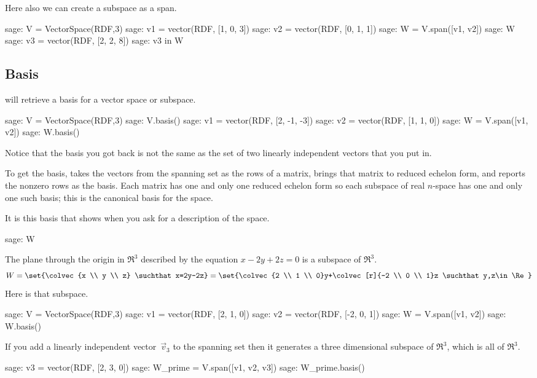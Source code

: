 Here also we can create a subspace as a span.
\begin{sagecommandline}
sage: V = VectorSpace(RDF,3)
sage: v1 = vector(RDF, [1, 0, 3])
sage: v2 = vector(RDF, [0, 1, 1])
sage: W = V.span([v1, v2])
sage: W
sage: v3 = vector(RDF, [2, 2, 8])
sage: v3 in W
\end{sagecommandline}



\subsection{Basis}
\Sage{} will retrieve a basis for a vector space or subspace.
\begin{sagecommandline}
sage: V = VectorSpace(RDF,3)
sage: V.basis()
sage: v1 = vector(RDF, [2, -1, -3])
sage: v2 = vector(RDF, [1, 1, 0])
sage: W = V.span([v1, v2])     
sage: W.basis()
\end{sagecommandline}
Notice that the basis you got back is not the same as the set of two linearly
independent vectors that you put in.

To get the basis, \Sage{} takes the vectors from the spanning set 
as the rows of a matrix,
brings that matrix to reduced echelon form, and reports the nonzero 
rows as the basis.
Each matrix has one and only one reduced echelon form so each 
subspace of real $n$-space has one and only one such basis;
this is the canonical basis for the space.

It is this basis that \Sage{} shows when you ask for a description
of the space.
\begin{sagecommandline}
sage: W  
\end{sagecommandline}

The plane through the origin in $\Re^3$ described by the equation
$x-2y+2z=0$
is a subspace of $\Re^3$.
\begin{equation*}
  W=\set{\colvec{x \\ y \\ z}
    \suchthat x=2y-2z}
  =\set{\colvec{2 \\ 1 \\ 0}y+\colvec[r]{-2 \\ 0 \\ 1}z
        \suchthat y,z\in\Re}
\end{equation*}
Here is that subspace.
\begin{sagecommandline}
sage: V = VectorSpace(RDF,3)               
sage: v1 = vector(RDF, [2, 1, 0]) 
sage: v2 = vector(RDF, [-2, 0, 1]) 
sage: W = V.span([v1, v2])       
sage: W.basis()
\end{sagecommandline}
If you add a linearly independent vector~$\vec{v}_3$ to the spanning set 
then it generates a three dimensional subspace of $\Re^3$, 
which is all of $\Re^3$.
\begin{sagecommandline}
sage: v3 = vector(RDF, [2, 3, 0])
sage: W_prime = V.span([v1, v2, v3])
sage: W_prime.basis()
\end{sagecommandline}

